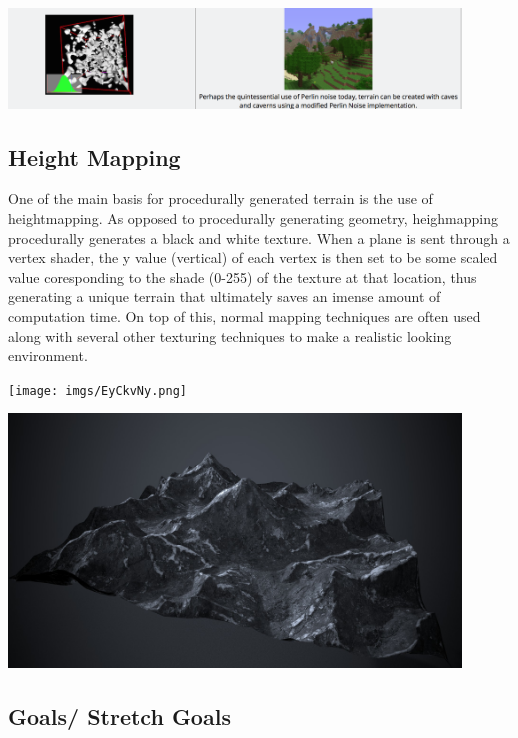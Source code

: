 \documentclass[12pt]{article}
\begin{document}
\begin{center}
    \includegraphics[width=0.9\textwidth]{imgs/noise.png}
\end{center}

\subsection{Height Mapping}

One of the main basis for procedurally generated terrain is the use of heightmapping. As opposed to procedurally 
generating geometry, heighmapping procedurally generates a black and white texture. When a plane is sent through a 
vertex shader, the y value (vertical) of each vertex is then set to be some scaled value coresponding to the shade 
(0-255) of the texture at that location, thus generating a unique terrain that ultimately saves an imense amount of 
computation time. On top of this, normal mapping techniques are often used along with several other texturing 
techniques to make a realistic looking environment.

\begin{center}
    \begin{minipage}{0.45\textwidth}
        \texttt{[image: imgs/EyCkvNy.png]}
    \end{minipage}
    \begin{minipage}{0.45\textwidth}
        \includegraphics[width=0.9\textwidth]{imgs/height.jpg}
    \end{minipage}
\end{center}

\subsection{Goals/ Stretch Goals}
\end{document}
